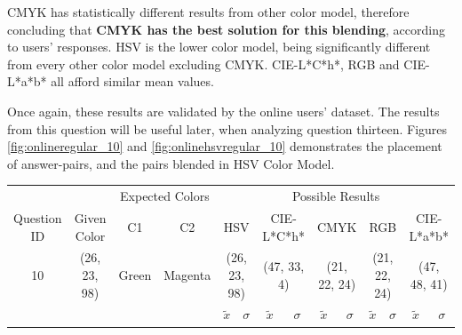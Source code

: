 CMYK has statistically different results from other color model, therefore concluding that \textbf{CMYK has the best solution for this blending}, according to
users' responses. HSV is the lower color model, being significantly different from every other color model excluding CMYK. CIE-L*C*h*, RGB and CIE-L*a*b* all afford similar mean values. \par
%
Once again, these results are validated by the online users' dataset. The results from this question will be useful later, when analyzing question thirteen. Figures \ref{fig:onlineregular_10} and
\ref{fig:onlinehsvregular_10} demonstrates the placement of answer-pairs, and the pairs blended in HSV Color Model.
%
\begin{table}[htbp]
  \resizebox{\textwidth}{!} {
  \begin{tabular}{lccccccccccccc}
    \hline
    \multicolumn{1}{c}{}                              &                                      & \multicolumn{2}{c}{Expected Colors}                   & \multicolumn{10}{c}{Possible Results}                                                                                                                                                                                                                                                                                        \\ \cline{3-14}
    \multicolumn{1}{c}{\multirow{-2}{*}{Question ID}} & \multirow{-2}{*}{Given Color}        & C1                       & C2                         & \multicolumn{2}{c}{HSV}                                        & \multicolumn{2}{c}{CIE-L*C*h*}                                 & \multicolumn{2}{c}{CMYK}                                       & \multicolumn{2}{c}{RGB}                                        & \multicolumn{2}{c}{CIE-L*a*b*}                                 \\ \hline
    \multicolumn{1}{c}{10}                             & \cellcolor[HTML]{0080FF}(26, 23, 98) & \multicolumn{1}{c|}{Green} & \multicolumn{1}{c|}{Magenta}  & \multicolumn{2}{c|}{\cellcolor[HTML]{0080FF}(26, 23, 98)}      & \multicolumn{2}{c|}{\cellcolor[HTML]{FF6F00}(47, 33, 4)}       & \multicolumn{2}{c|}{\cellcolor[HTML]{808080}(21, 22, 24)}       & \multicolumn{2}{c|}{\cellcolor[HTML]{808080}(21, 22, 24)}       & \multicolumn{2}{c|}{\cellcolor[HTML]{C9B2A2}(47, 48, 41)}       \\ \hline
                                                      & \multicolumn{1}{l}{}                 & \multicolumn{1}{l}{}     & \multicolumn{1}{l}{}       & \multicolumn{1}{c}{$\tilde{x}$} & \multicolumn{1}{c}{$\sigma$} & \multicolumn{1}{c}{$\tilde{x}$} & \multicolumn{1}{c}{$\sigma$} & \multicolumn{1}{c}{$\tilde{x}$} & \multicolumn{1}{c}{$\sigma$} & \multicolumn{1}{c}{$\tilde{x}$} & \multicolumn{1}{c}{$\sigma$} & \multicolumn{1}{c}{$\tilde{x}$} & \multicolumn{1}{c}{$\sigma$} \\ \hline

\end{tabular}}
\end{table}
